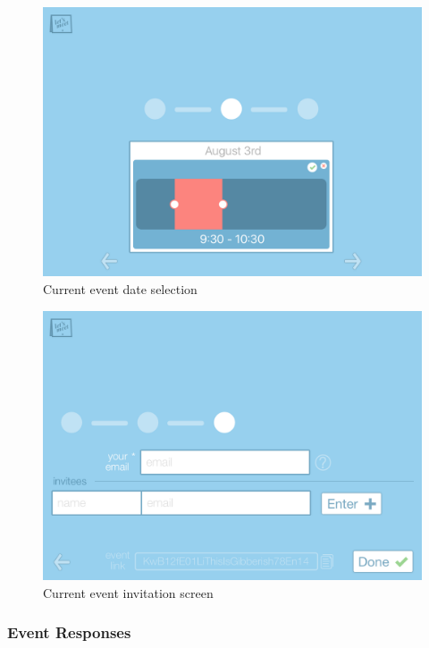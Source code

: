 \documentclass{sigchi}
\begin{document}
\begin{figure}
  \centering
  \includegraphics[width=1.75\columnwidth]{Mockup/TimeSelection}
  \caption{Current event date selection}
\end{figure}

\begin{figure}
  \centering
  \includegraphics[width=1.75\columnwidth]{Mockup/Invitees}
  \caption{Current event invitation screen}
\end{figure}
\FloatBarrier

\subsubsection{Event Responses}
\end{document}
